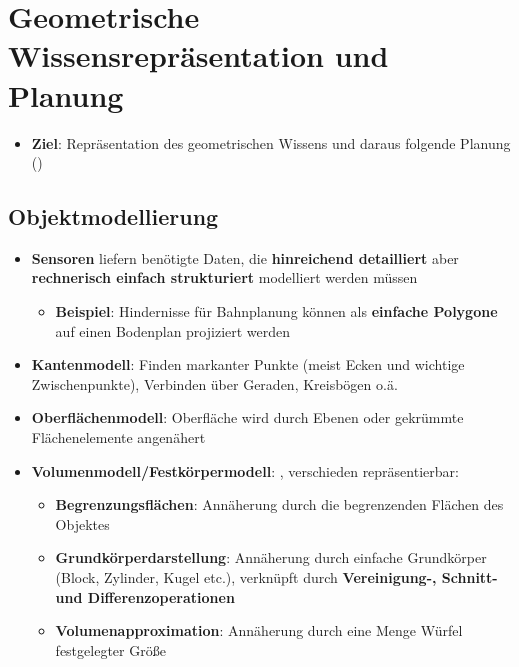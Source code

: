 \section{Geometrische Wissensrepräsentation und Planung}%
\label{grep:sec:geometrische_wissensrepraesentation_und_planung}

\begin{itemize}
	\item \textbf{Ziel}: Repräsentation des geometrischen Wissens und daraus folgende Planung ()
\end{itemize}

\subsection{Objektmodellierung}%
\label{grep:sub:objektmodellierung}

\begin{itemize}
	\item \textbf{Sensoren} liefern benötigte Daten, die \textbf{hinreichend detailliert} aber \textbf{rechnerisch einfach strukturiert} modelliert werden müssen
	\begin{itemize}
		\item \textbf{Beispiel}: Hindernisse für Bahnplanung können als \textbf{einfache Polygone} auf einen Bodenplan projiziert werden
	\end{itemize}
	\item \textbf{Kantenmodell}: Finden markanter Punkte (meist Ecken und wichtige Zwischenpunkte), Verbinden über Geraden, Kreisbögen o.ä.
	\item \textbf{Oberflächenmodell}: Oberfläche wird durch Ebenen oder gekrümmte Flächenelemente angenähert
	\item \textbf{Volumenmodell/Festkörpermodell}: , verschieden repräsentierbar:
	\begin{itemize}
		\item \textbf{Begrenzungsflächen}: Annäherung durch die begrenzenden Flächen des Objektes
		\item \textbf{Grundkörperdarstellung}: Annäherung durch einfache Grundkörper (Block, Zylinder, Kugel etc.), verknüpft durch \textbf{Vereinigung-, Schnitt- und Differenzoperationen}
		\item \textbf{Volumenapproximation}: Annäherung durch eine Menge Würfel festgelegter Größe
	\end{itemize}
\end{itemize}

